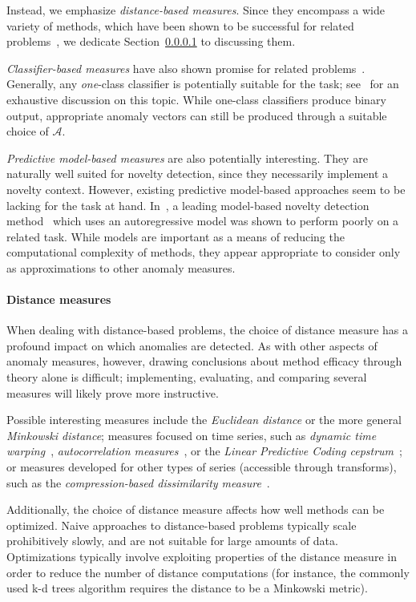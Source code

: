 Instead, we emphasize \emph{distance-based measures}. Since they encompass a wide variety of methods, which have been shown to be successful for related problems~\cite{chandola3}, we dedicate Section~\ref{sect:distance_mezurez} to discussing them.

\emph{Classifier-based measures} have also shown promise for related problems~\cite{chandola3}. Generally, any \emph{one}-class classifier is potentially suitable for the task; see~\cite{classification} for an exhaustive discussion on this topic. While one-class classifiers produce binary output, appropriate anomaly vectors can still be produced through a suitable choice of $\mathcal{A}$.

\emph{Predictive model-based measures} are also potentially interesting. They are naturally well suited for novelty detection, since they necessarily implement a novelty context. However, existing predictive model-based approaches seem to be lacking for the task at hand. In~\cite{chandola3}, a leading model-based novelty detection method~\cite{perkins2} which uses an autoregressive model was shown to perform poorly on a related task. While models are important as a means of reducing the computational complexity of methods, they appear appropriate to consider only as approximations to other anomaly measures.

\paragraph{Distance measures}
\label{sect:distance_mezurez}

When dealing with distance-based problems, the choice of distance measure has a profound impact on which anomalies are detected. As with other aspects of anomaly measures, however, drawing conclusions about method efficacy through theory alone is difficult; implementing, evaluating, and comparing several measures will likely prove more instructive.

Possible interesting measures include the \emph{Euclidean distance} or the more general \emph{Minkowski distance}; measures focused on time series, such as \emph{dynamic time warping}~\cite{dtw}, \emph{autocorrelation measures}~\cite{autocorrelation}, or the \emph{Linear Predictive Coding cepstrum}~\cite{cepstrum}; or measures developed for other types of series (accessible through transforms), such as the \emph{compression-based dissimilarity measure}~\cite{keogh2}.

Additionally, the choice of distance measure affects how well methods can be optimized. Naive approaches to distance-based problems typically scale prohibitively slowly, and are not suitable for large amounts of data. Optimizations typically involve exploiting properties of the distance measure in order to reduce the number of distance computations (for instance, the commonly used k-d trees algorithm requires the distance to be a Minkowski metric).

